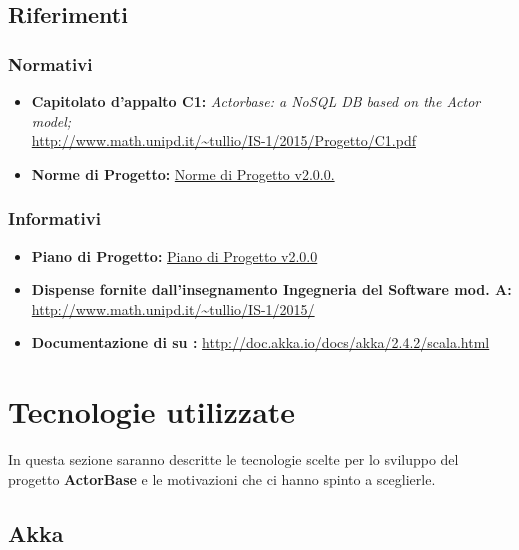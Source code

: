 \documentclass{scalatekids-article}
\begin{document}
\prodPurpose

\glossExpl

\subsection{Riferimenti}

\subsubsection{Normativi}

\begin{itemize}

\item\textbf{Capitolato d'appalto C1:} \textit{Actorbase: a NoSQL DB based on the Actor model;}\\
  \url{http://www.math.unipd.it/~tullio/IS-1/2015/Progetto/C1.pdf}
\item\textbf{Norme di Progetto:}
  \href{run:../Interni/NormeDiProgetto\_v2.0.0.pdf}{Norme di Progetto v2.0.0.}
\end{itemize}

\subsubsection{Informativi}

\begin{itemize}
\item\textbf{Piano di Progetto:}
  \href{run:./PianoDiProgetto\_v2.0.0.pdf}{Piano di Progetto v2.0.0}
\item\textbf{Dispense fornite dall'insegnamento Ingegneria del Software mod.
    A:}\\   \url{http://www.math.unipd.it/~tullio/IS-1/2015/}
\item\textbf{Documentazione di  su :}
  \url{http://doc.akka.io/docs/akka/2.4.2/scala.html}
\end{itemize}

\newpage

\section{Tecnologie utilizzate}

In questa sezione saranno descritte le tecnologie scelte per lo sviluppo del
progetto \textbf{ActorBase} e le motivazioni che ci hanno spinto a sceglierle.

\subsection{Akka}
\end{document}
